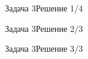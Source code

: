 \begin{frame}[fragile]{Задача 3}{Решение 1/4}

\end{frame}

\begin{frame}[fragile]{Задача 3}{Решение 2/3}

\end{frame}

\begin{frame}[fragile]{Задача 3}{Решение 3/3}

\end{frame}

% 

% 
% 
% 
% 
% 
% 
% 
